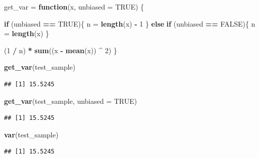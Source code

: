\documentclass[]{book}
\newenvironment{Shaded}{\begin{snugshade}}{\end{snugshade}}
\newcommand{\KeywordTok}[1]{\textcolor[rgb]{0.13,0.29,0.53}{\textbf{#1}}}
\newcommand{\DataTypeTok}[1]{\textcolor[rgb]{0.13,0.29,0.53}{#1}}
\newcommand{\DecValTok}[1]{\textcolor[rgb]{0.00,0.00,0.81}{#1}}
\newcommand{\StringTok}[1]{\textcolor[rgb]{0.31,0.60,0.02}{#1}}
\newcommand{\OtherTok}[1]{\textcolor[rgb]{0.56,0.35,0.01}{#1}}
\newcommand{\ControlFlowTok}[1]{\textcolor[rgb]{0.13,0.29,0.53}{\textbf{#1}}}
\newcommand{\OperatorTok}[1]{\textcolor[rgb]{0.81,0.36,0.00}{\textbf{#1}}}
\newcommand{\NormalTok}[1]{#1}
\begin{document}
\begin{Shaded}
\begin{Highlighting}[]
\NormalTok{get_var =}\StringTok{ }\ControlFlowTok{function}\NormalTok{(x, }\DataTypeTok{unbiased =} \OtherTok{TRUE}\NormalTok{) \{}

  \ControlFlowTok{if}\NormalTok{ (unbiased }\OperatorTok{==}\StringTok{ }\OtherTok{TRUE}\NormalTok{)\{}
\NormalTok{    n =}\StringTok{ }\KeywordTok{length}\NormalTok{(x) }\OperatorTok{-}\StringTok{ }\DecValTok{1}
\NormalTok{  \} }\ControlFlowTok{else} \ControlFlowTok{if}\NormalTok{ (unbiased }\OperatorTok{==}\StringTok{ }\OtherTok{FALSE}\NormalTok{)\{}
\NormalTok{    n =}\StringTok{ }\KeywordTok{length}\NormalTok{(x) }
\NormalTok{   \}}

\NormalTok{  (}\DecValTok{1} \OperatorTok{/}\StringTok{ }\NormalTok{n) }\OperatorTok{*}\StringTok{ }\KeywordTok{sum}\NormalTok{((x }\OperatorTok{-}\StringTok{ }\KeywordTok{mean}\NormalTok{(x)) }\OperatorTok{^}\StringTok{ }\DecValTok{2}\NormalTok{)}
\NormalTok{\}}
\end{Highlighting}
\end{Shaded}

\begin{Shaded}
\begin{Highlighting}[]
\KeywordTok{get_var}\NormalTok{(test_sample)}
\end{Highlighting}
\end{Shaded}

\begin{verbatim}
## [1] 15.5245
\end{verbatim}

\begin{Shaded}
\begin{Highlighting}[]
\KeywordTok{get_var}\NormalTok{(test_sample, }\DataTypeTok{unbiased =} \OtherTok{TRUE}\NormalTok{)}
\end{Highlighting}
\end{Shaded}

\begin{verbatim}
## [1] 15.5245
\end{verbatim}

\begin{Shaded}
\begin{Highlighting}[]
\KeywordTok{var}\NormalTok{(test_sample)}
\end{Highlighting}
\end{Shaded}

\begin{verbatim}
## [1] 15.5245
\end{verbatim}
\end{document}
